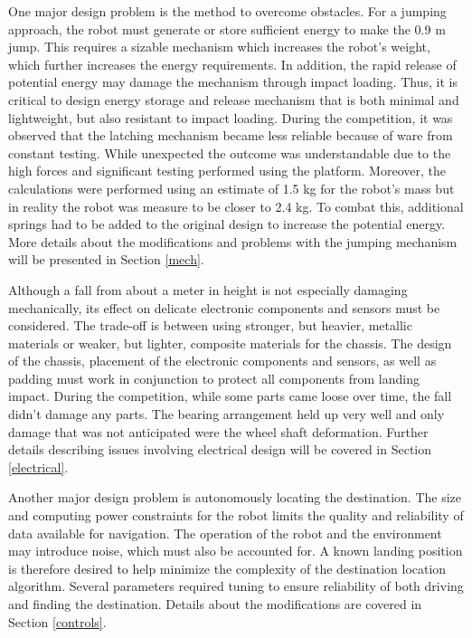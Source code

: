 \documentclass[ece]{uw-wkrpt}
\begin{document}
One major design problem is the method to overcome obstacles. For a jumping approach, the robot must generate or store sufficient energy to make the 0.9 m jump. This requires a sizable mechanism which increases the robot’s weight, which further increases the energy requirements. In addition, the rapid release of potential energy may damage the mechanism through impact loading. Thus, it is critical to design energy storage and release mechanism that is both minimal and lightweight, but also resistant to impact loading. During the competition, it was observed that the latching mechanism became less reliable because of ware from constant testing. While unexpected the outcome was understandable due to the high forces and significant testing performed using the platform. Moreover, the calculations were performed using an estimate of 1.5 kg for the robot's mass but in reality the robot was measure to be closer to 2.4 kg. To combat this, additional springs had to be added to the original design to increase the potential energy. More details about the modifications and problems with the jumping mechanism will be presented in Section \ref{mech}.

Although a fall from about a meter in height is not especially damaging mechanically, its effect on delicate electronic components and sensors must be considered. The trade-off is between using stronger, but heavier, metallic materials or weaker, but lighter, composite materials for the chassis. The design of the chassis, placement of the electronic components and sensors, as well as padding must work in conjunction to protect all components from landing impact. During the competition, while some parts came loose over time, the fall didn’t damage any parts. The bearing arrangement held up very well and only damage that was not anticipated were the wheel shaft deformation. Further details describing issues involving electrical design will be covered in Section \ref{electrical}.

Another major design problem is autonomously locating the destination. The size and computing power constraints for the robot limits the quality and reliability of data available for navigation. The operation of the robot and the environment may introduce noise, which must also be accounted for. A known landing position is therefore desired to help minimize the complexity of the destination location algorithm. Several parameters required tuning to ensure reliability of both driving and finding the destination. Details about the modifications are covered in Section \ref{controls}. 
\end{document}

